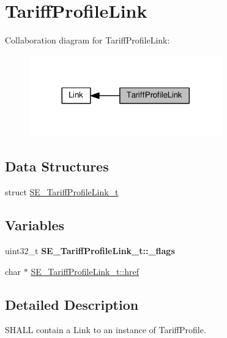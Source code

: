 \hypertarget{group__TariffProfileLink}{}\section{Tariff\+Profile\+Link}
\label{group__TariffProfileLink}
Collaboration diagram for Tariff\+Profile\+Link\+:\nopagebreak
\begin{figure}[H]
\begin{center}
\leavevmode
\includegraphics[width=236pt]{group__TariffProfileLink}
\end{center}
\end{figure}
\subsection*{Data Structures}
\begin{DoxyCompactItemize}
\item 
struct \hyperlink{structSE__TariffProfileLink__t}{S\+E\+\_\+\+Tariff\+Profile\+Link\+\_\+t}
\end{DoxyCompactItemize}
\subsection*{Variables}
\begin{DoxyCompactItemize}
\item 
\mbox{\label{group__TariffProfileLink_ga7d2bcdd4aa03615a243489441f9203a2}} 
uint32\+\_\+t {\bfseries S\+E\+\_\+\+Tariff\+Profile\+Link\+\_\+t\+::\+\_\+flags}
\item 
char $\ast$ \hyperlink{group__TariffProfileLink_ga723f6a02e0b130273ca497c1b5b94cef}{S\+E\+\_\+\+Tariff\+Profile\+Link\+\_\+t\+::href}
\end{DoxyCompactItemize}


\subsection{Detailed Description}
S\+H\+A\+LL contain a Link to an instance of Tariff\+Profile. 


